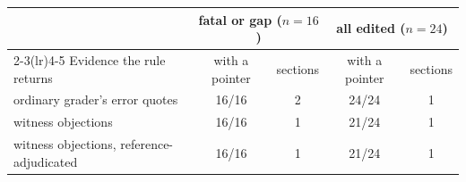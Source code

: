 \begin{tabular}{@{}lcccc@{}}
\toprule
 & \multicolumn{2}{c}{fatal or gap ($n{=}16$)} & \multicolumn{2}{c}{all edited ($n{=}24$)} \\
\cmidrule(lr){2-3}\cmidrule(lr){4-5}
Evidence the rule returns & with a pointer & sections & with a pointer & sections \\
\midrule
ordinary grader's error quotes & 16/16 & 2 & 24/24 & 1 \\
witness objections & 16/16 & 1 & 21/24 & 1 \\
witness objections, reference-adjudicated & 16/16 & 1 & 21/24 & 1 \\
\bottomrule
\end{tabular}
